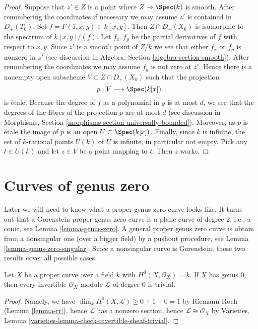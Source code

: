 \begin{proof}
Suppose that $z' \in Z$ is a point where $Z \to \Spec(k)$ is smooth.
After renumbering the coordinates if necessary we may assume
$z'$ is contained in $D_+(T_0)$. Set $f = F(1, x, y) \in k[x, y]$.
Then $Z \cap D_+(X_0)$ is isomorphic to the spectrum of $k[x, y]/(f)$.
Let $f_x, f_y$ be the partial derivatives of $f$ with respect to
$x, y$. Since $z'$ is a smooth point of $Z/k$ we see that either
$f_x$ or $f_y$ is nonzero in $z'$ (see discussion in
Algebra, Section \ref{algebra-section-smooth}).
After renumbering the coordinates
we may assume $f_y$ is not zero at $z'$. Hence there is a nonempty
open subscheme $V \subset Z \cap D_{+}(X_0)$ such that the
projection
$$
p : V \longrightarrow \Spec(k[x])
$$
is \'etale. Because the degree of $f$ as a polynomial in $y$
is at most $d$, we see that the degrees of the fibres of the
projection $p$ are at most $d$ (see discussion in
Morphisms, Section \ref{morphisms-section-universally-bounded}).
Moreover, as $p$ is \'etale
the image of $p$ is an open $U \subset \Spec(k[x])$.
Finally, since $k$ is infinite, the set of $k$-rational points
$U(k)$ of $U$ is infinite, in particular not empty. Pick any
$t \in U(k)$ and let $z \in V$ be a point mapping to $t$.
Then $z$ works.
\end{proof}





\section{Curves of genus zero}
\label{section-genus-zero}

\noindent
Later we will need to know what a proper genus zero curve looks like.
It turns out that a Gorenstein proper genus zero curve is a plane
curve of degree $2$, i.e., a conic, see Lemma \ref{lemma-genus-zero}.
A general proper genus zero curve is obtain from a nonsingular one
(over a bigger field) by a pushout procedure, see
Lemma \ref{lemma-genus-zero-singular}.
Since a nonsingular curve is Gorenstein, these two results
cover all possible cases.

\begin{lemma}
\label{lemma-genus-zero-pic}
Let $X$ be a proper curve over a field $k$ with $H^0(X, \mathcal{O}_X) = k$.
If $X$ has genus $0$, then every invertible $\mathcal{O}_X$-module
$\mathcal{L}$ of degree $0$ is trivial.
\end{lemma}

\begin{proof}
Namely, we have $\dim_k H^0(X, \mathcal{L}) \geq 0 + 1 - 0 = 1$
by Riemann-Roch (Lemma \ref{lemma-rr}), hence $\mathcal{L}$ has a
nonzero section, hence $\mathcal{L} \cong \mathcal{O}_X$ by
Varieties, Lemma \ref{varieties-lemma-check-invertible-sheaf-trivial}.
\end{proof}

